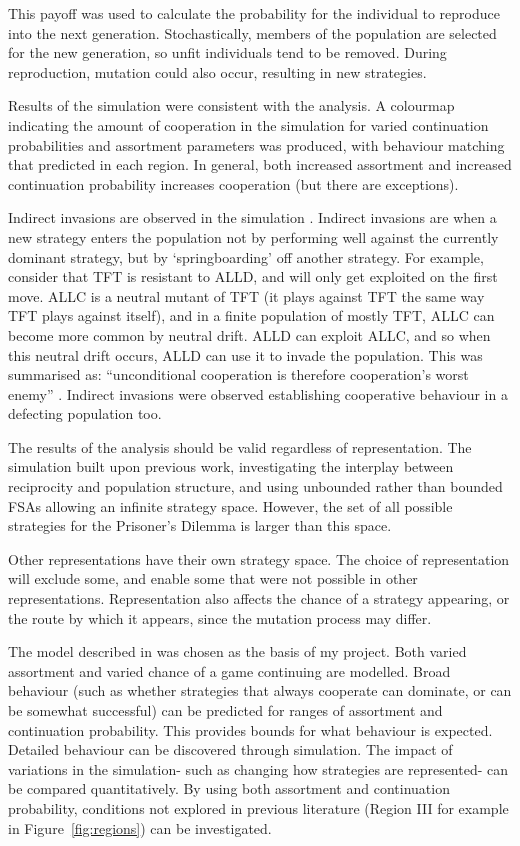 \documentclass[a4paper,11pt,bcshonoursthesis,singlespace,twoside,thesisdraft,pdflatex]{cssethesis}
\begin{document}
This payoff was used to calculate the probability for the individual to reproduce into the next generation. Stochastically, members of the population are selected for the new generation, so unfit individuals tend to be removed. 
During reproduction, mutation could also occur, resulting in new strategies. 

Results of the simulation were consistent with the analysis. 
A colourmap indicating the amount of cooperation in the simulation for varied continuation probabilities and assortment parameters was produced, with behaviour matching that predicted in each region. 
In general, both increased assortment and increased continuation probability increases cooperation (but there are exceptions). 

Indirect invasions are observed in the simulation \citep{garcia:PLoSOne:2012}. 
Indirect invasions are when a new strategy enters the population not by performing well against the currently dominant strategy, but by `springboarding' off another strategy. 
For example, consider that TFT is resistant to ALLD, and will only get exploited on the first move. 
ALLC is a neutral mutant of TFT (it plays against TFT the same way TFT plays against itself), and in a finite population of mostly TFT, ALLC can become more common by neutral drift. 
ALLD can exploit ALLC, and so when this neutral drift occurs, ALLD can use it to invade the population. 
This was summarised as: ``unconditional cooperation is therefore cooperation's worst enemy'' \citep{van-veelen:PNAS:2012}. 
Indirect invasions were observed establishing cooperative behaviour in a defecting population too. 

The results of the analysis should be valid regardless of representation. The simulation built upon previous work, investigating the interplay between reciprocity and population structure, and using unbounded rather than bounded FSAs allowing an infinite strategy space. 
However, the set of all possible strategies for the Prisoner's Dilemma is larger than this space. 

Other representations have their own strategy space. 
The choice of representation will exclude some, and enable some that were not possible in other representations. 
Representation also affects the chance of a strategy appearing, or the route by which it appears, since the mutation process may differ.
 
The model described in \citet{van-veelen:PNAS:2012} was chosen as the basis of my project. 
Both varied assortment and varied chance of a game continuing are modelled. 
Broad behaviour (such as whether strategies that always cooperate can dominate, or can be somewhat successful) can be predicted for ranges of assortment and continuation probability. This provides bounds for what behaviour is expected. 
Detailed behaviour can be discovered through simulation. 
The impact of variations in the simulation- such as changing how strategies are represented- can be compared quantitatively.
By using both assortment and continuation probability, conditions not explored in previous literature (Region III for example in Figure~\ref{fig:regions}) can be investigated.
\end{document}

